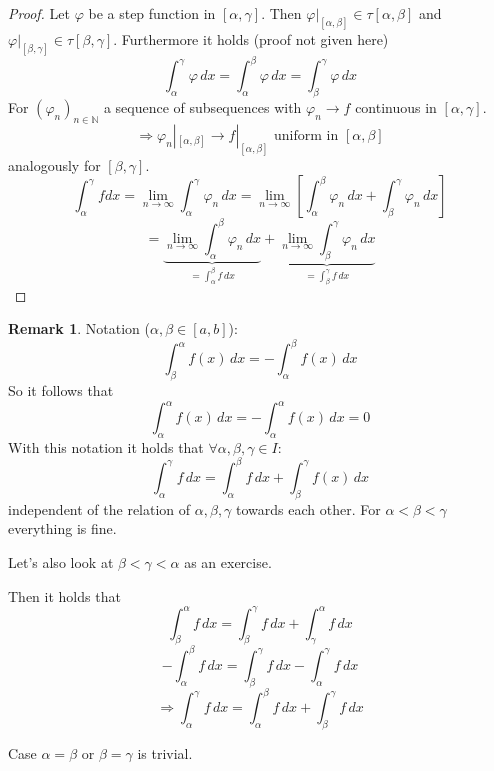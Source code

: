 \documentclass[a4paper,landscape,twocolumn]{article}
\theoremstyle{definition}
\newtheorem{rem}{Remark}
\begin{document}
\begin{proof}
  Let $\varphi$ be a step function in $[\alpha, \gamma]$. Then $\varphi |_{[\alpha, \beta]} \in \tau[\alpha,\beta]$
  and $\varphi |_{[\beta,\gamma]} \in \tau[\beta,\gamma]$.
  Furthermore it holds (proof not given here)
  \[ \int_\alpha^\gamma \varphi \, dx = \int_\alpha^\beta \varphi \, dx = \int_\beta^\gamma \varphi \, dx \]
  For $(\varphi_n)_{n \in \mathbb N}$ a sequence of subsequences with $\varphi_n \to f$ continuous in $[\alpha,\gamma]$.
  \[ \Rightarrow \varphi_n |_{[\alpha,\beta]} \to f|_{[\alpha,\beta]} \text{ uniform in } [\alpha,\beta] \]
  analogously for $[\beta,\gamma]$.
  \[
    \int_{\alpha}^\gamma f dx
    = \lim_{n\to\infty} \int_\alpha^\gamma \varphi_n \, dx
    = \lim_{n\to\infty} \left[\int_\alpha^\beta \varphi_n \, dx + \int_\beta^\gamma \varphi_n \, dx\right]
  \] \[
    = \underbrace{\lim_{n\to\infty} \int_\alpha^\beta \varphi_n \, dx}_{=\int_\alpha^\beta f \, dx}
    + \underbrace{\lim_{n\to\infty} \int_\beta^\gamma \varphi_n \, dx}_{=\int_\beta^\gamma f \, dx}
  \]
\end{proof}

\begin{rem}
  Notation ($\alpha,\beta \in [a,b]$):
  \[ \int_\beta^\alpha f(x) \, dx = - \int_\alpha^\beta f(x) \, dx \]
  So it follows that
  \[ \int_\alpha^\alpha f(x) \, dx = - \int_\alpha^\alpha f(x) \, dx = 0 \]
  With this notation it holds that $\forall \alpha,\beta,\gamma \in I$:
  \[ \int_\alpha^\gamma f \, dx = \int_\alpha^\beta f \, dx + \int_\beta^\gamma f(x) \, dx \]
  independent of the relation of $\alpha, \beta, \gamma$ towards each other.
  For $\alpha < \beta < \gamma$ everything is fine.

  Let's also look at $\beta < \gamma < \alpha$ as an exercise.

  Then it holds that
  \[ \int_\beta^\alpha f \, dx = \int_\beta^\gamma f \, dx + \int_\gamma^\alpha f \, dx \]
  \[ - \int_\alpha^\beta f \, dx = \int_\beta^\gamma f \, dx - \int_\alpha^\gamma f \, dx \]
  \[ \Rightarrow \int_\alpha^\gamma f \, dx = \int_\alpha^\beta f \, dx + \int_\beta^\gamma f \, dx \]

  Case $\alpha = \beta$ or $\beta = \gamma$ is trivial.
\end{rem}
\end{document}
